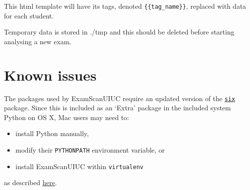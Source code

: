 \documentclass[a4paper]{article}
\begin{document}
This html template will have its tags, denoted \texttt{\{\{tag\_name\}\}}, replaced with data for each student.

Temporary data is stored in ./tmp and this should be deleted before starting analysing a new exam.

\section{Known issues}

The packages used by ExamScanUIUC require an updated version of the \href{https://pypi.org/project/six/}{\texttt{six}} package.
Since this is included as an `Extra' package in the included system Python on OS X, Mac users may need to:
\begin{itemize}
\item install Python manually,
\item modify their \texttt{PYTHONPATH} environment variable, or
\item install ExamScanUIUC within \texttt{virtualenv}
\end{itemize}
as described \href{http://stackoverflow.com/questions/29485741/unable-to-upgrade-python-six-package-in-mac-osx-10-10-2}{here}.
\end{document}

